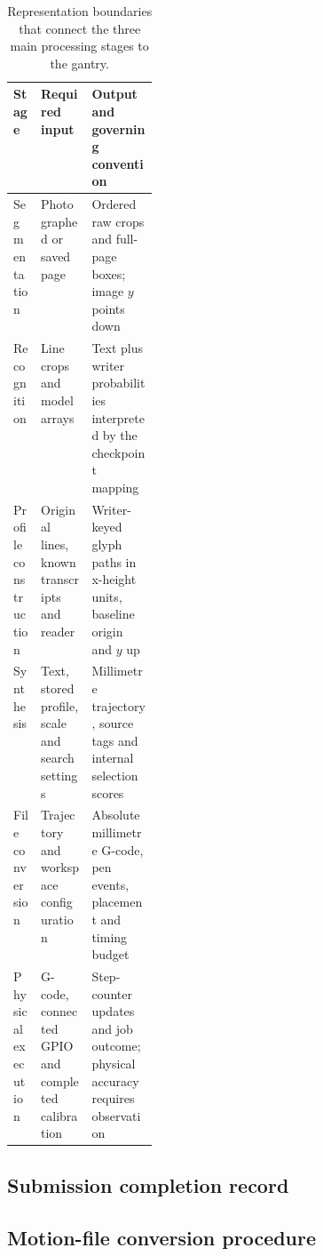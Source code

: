 \begin{table}[!htbp]\centering\small
\begin{tabularx}{\linewidth}{|p{0.19\linewidth}|X|X|}
\hline\textbf{Stage}&\textbf{Required input}&\textbf{Output and governing convention}\\\hline
Segmentation&Photographed or saved page&Ordered raw crops and full-page boxes; image $y$ points down\\\hline
Recognition&Line crops and model arrays&Text plus writer probabilities interpreted by the checkpoint mapping\\\hline
Profile construction&Original lines, known transcripts and reader&Writer-keyed glyph paths in x-height units, baseline origin and $y$ up\\\hline
Synthesis&Text, stored profile, scale and search settings&Millimetre trajectory, source tags and internal selection scores\\\hline
File conversion&Trajectory and workspace configuration&Absolute millimetre G-code, pen events, placement and timing budget\\\hline
Physical execution&G-code, connected GPIO and completed calibration&Step-counter updates and job outcome; physical accuracy requires observation\\\hline
\end{tabularx}
\caption{Representation boundaries that connect the three main processing stages to the gantry.}
\label{tab:des-contracts}
\end{table}

\FloatBarrier
\subsection{Submission completion record}
\FloatBarrier

\subsection{Motion-file conversion procedure}\label{app:des-machine-procedure}

